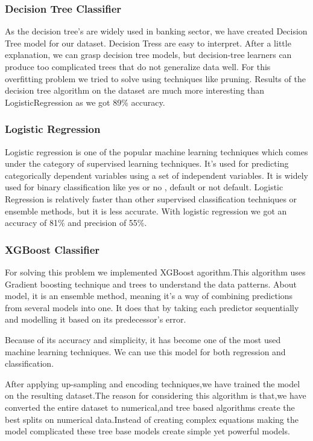 \documentclass[12pt]{article}
\begin{document}
\subsubsection{Decision Tree Classifier}
As the decision tree's are widely used in banking sector, we have created Decision Tree model for our dataset. Decision Tress are easy to interpret. After a little explanation, we can grasp decision tree models, but decision-tree learners can produce too complicated trees that do not generalize data well. For this overfitting problem we tried to solve using techniques like pruning.
Results of the decision tree algorithm on the dataset are much more interesting than LogisticRegression as we got 89\% accuracy.

\subsubsection{Logistic Regression}
Logistic regression is one of the popular machine learning techniques which comes under the category of supervised learning techniques. It’s used for predicting categorically dependent variables using a set of independent variables. It is widely used for binary classification like yes or no , default or not default. Logistic Regression is relatively faster than other supervised classification techniques or ensemble methods, but it is less accurate. With logistic regression we got an accuracy of 81\% and precision of 55\%.

\subsubsection{XGBoost Classifier}
For solving this problem we implemented XGBoost agorithm.This algorithm uses Gradient boosting technique and trees to understand the data patterns. About model, it is an  ensemble method, meaning it’s a way of combining predictions from several models into one. It does that by taking each predictor sequentially and modelling it based on its predecessor’s error.

Because of its accuracy and simplicity, it has become one of the most used machine learning techniques. We can use this model for both regression and classification.

After applying up-sampling and encoding techniques,we have trained the model on the resulting dataset.The reason for considering this algorithm is that,we have converted the entire dataset to numerical,and tree based algorithms create the best splits on numerical data.Instead of creating complex equations making the model complicated these tree base models create simple yet powerful models.
\end{document}
